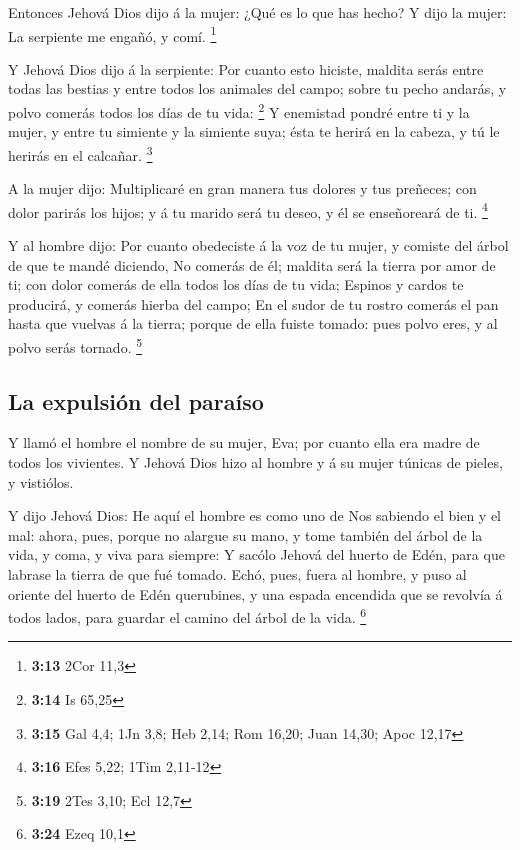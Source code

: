  Entonces Jehová Dios dijo á la mujer: ¿Qué es lo que has
hecho? Y dijo la mujer: La serpiente me engañó, y comí. \footnote{\textbf{3:13}
  2Cor 11,3}

 Y Jehová Dios dijo á la serpiente: Por cuanto esto
hiciste, maldita serás entre todas las bestias y entre todos los
animales del campo; sobre tu pecho andarás, y polvo comerás todos los
días de tu vida: \footnote{\textbf{3:14} Is 65,25}  Y
enemistad pondré entre ti y la mujer, y entre tu simiente y la simiente
suya; ésta te herirá en la cabeza, y tú le herirás en el calcañar.
\footnote{\textbf{3:15} Gal 4,4; 1Jn 3,8; Heb 2,14; Rom 16,20; Juan
  14,30; Apoc 12,17}

 A la mujer dijo: Multiplicaré en gran manera tus dolores
y tus preñeces; con dolor parirás los hijos; y á tu marido será tu
deseo, y él se enseñoreará de ti. \footnote{\textbf{3:16} Efes 5,22;
  1Tim 2,11-12}

 Y al hombre dijo: Por cuanto obedeciste á la voz de tu
mujer, y comiste del árbol de que te mandé diciendo, No comerás de él;
maldita será la tierra por amor de ti; con dolor comerás de ella todos
los días de tu vida;  Espinos y cardos te producirá, y
comerás hierba del campo;  En el sudor de tu rostro
comerás el pan hasta que vuelvas á la tierra; porque de ella fuiste
tomado: pues polvo eres, y al polvo serás tornado. \footnote{\textbf{3:19}
  2Tes 3,10; Ecl 12,7}

\hypertarget{la-expulsiuxf3n-del-parauxedso}{%
\subsection{La expulsión del
paraíso}\label{la-expulsiuxf3n-del-parauxedso}}

 Y llamó el hombre el nombre de su mujer, Eva; por cuanto
ella era madre de todos los vivientes.  Y Jehová Dios
hizo al hombre y á su mujer túnicas de pieles, y vistiólos.

 Y dijo Jehová Dios: He aquí el hombre es como uno de Nos
sabiendo el bien y el mal: ahora, pues, porque no alargue su mano, y
tome también del árbol de la vida, y coma, y viva para siempre:
 Y sacólo Jehová del huerto de Edén, para que labrase la
tierra de que fué tomado.  Echó, pues, fuera al hombre, y
puso al oriente del huerto de Edén querubines, y una espada encendida
que se revolvía á todos lados, para guardar el camino del árbol de la
vida. \footnote{\textbf{3:24} Ezeq 10,1}

